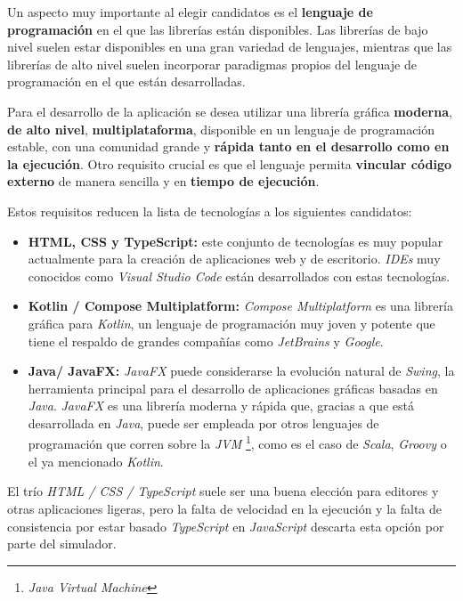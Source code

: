 Un aspecto muy importante al elegir candidatos es el \textbf{lenguaje de programación}
en el que las librerías están disponibles.
Las librerías de bajo nivel suelen estar disponibles en una gran variedad de lenguajes, mientras que las
librerías de alto nivel suelen incorporar paradigmas propios del lenguaje de programación en el que están
desarrolladas.

Para el desarrollo de la aplicación se desea utilizar una librería gráfica \textbf{moderna},
\textbf{de alto nivel}, \textbf{multiplataforma}, disponible en un lenguaje de programación estable,
con una comunidad grande y \textbf{rápida tanto en el desarrollo como en la ejecución}.
Otro requisito crucial es que el lenguaje permita \textbf{vincular código externo} de manera
sencilla y en \textbf{tiempo de ejecución}.

Estos requisitos reducen la lista de tecnologías a los siguientes candidatos:
\begin{itemize}
    \item \textbf{HTML, CSS y TypeScript:} este conjunto de tecnologías es muy popular actualmente
    para la creación de aplicaciones web y de escritorio. \textit{IDEs} muy conocidos como
    \textit{Visual Studio Code} están desarrollados con estas tecnologías.
    \item \textbf{Kotlin / Compose Multiplatform:} \textit{Compose Multiplatform} es una librería gráfica
    para \textit{Kotlin}, un lenguaje de programación muy joven y potente que tiene el respaldo de
    grandes compañías como \textit{JetBrains} y \textit{Google}.
    \item \textbf{Java/ JavaFX:}
    \textit{JavaFX} puede considerarse la evolución natural de \textit{Swing},
    la herramienta principal para el desarrollo de aplicaciones gráficas basadas en \textit{Java}.
    \textit{JavaFX} es una librería moderna y rápida que, gracias a que está desarrollada en \textit{Java},
    puede ser empleada por otros lenguajes de programación que corren sobre la \textit{JVM}
    \footnote{\textit{Java Virtual Machine}}, como es el caso de \textit{Scala}, \textit{Groovy} o el ya mencionado
    \textit{Kotlin}.
\end{itemize}

El trío \textit{HTML / CSS / TypeScript} suele ser una buena elección para editores y otras
aplicaciones ligeras, pero la falta de velocidad en la ejecución y la falta de consistencia por estar
basado \textit{TypeScript} en \textit{JavaScript} descarta esta opción por parte del simulador.


